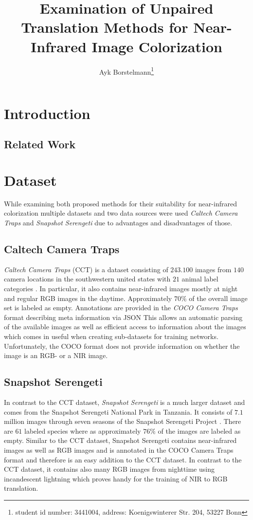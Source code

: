 \documentclass[a4paper,11pt, DIV=12]{scrartcl}
\title{Examination of Unpaired Translation Methods for Near-Infrared Image Colorization}
\author{Ayk Borstelmann\footnote{student id number: 3441004, address: Koenigswinterer Str. 204, 53227 Bonn}}
\begin{document}
\maketitle

\section{Introduction}

\subsection{Related Work}



\section{Dataset}
While examining both proposed methods for their suitability for near-infrared colorization multiple datasets 
and two data sources were used \textit{Caltech Camera Traps} and \textit{Snapshot Serengeti} due to advantages 
and disadvantages of those. 

\subsection{Caltech Camera Traps}
\textit{Caltech Camera Traps} (CCT) is a dataset consisting of $243.100$ images from $140$ camera locations 
in the southwestern united states with $21$ animal label categories \cite{caltech}. 
In particular, it also contains near-infrared images mostly at night and regular RGB images in the daytime. 
Approximately $70 \%$ of the overall image set is labeled as empty. 
Annotations are provided in the \textit{COCO Camera Traps} format describing meta information via JSON \cite{caltech}
This allows an automatic parsing of the available images as well as efficient access to information about 
the images which comes in useful when creating sub-datasets for training networks.
Unfortunately, the COCO format does not provide information on whether the image is an RGB- or a NIR image. 

\subsection{Snapshot Serengeti}
In contrast to the CCT dataset, \textit{Snapshot Serengeti} is a much larger dataset and comes from the Snapshot Serengeti National Park in Tanzania.
It consists of $7.1$ million images through seven seasons of the Snapshot Serengeti Project \cite{serengeti}. 
There are $61$ labeled species where as approximately $76\%$ of the images are labeled as empty. 
Similar to the CCT dataset, Snapshot Serengeti contains near-infrared images as well as RGB images and 
is annotated in the COCO Camera Traps format \cite{serengeti} and therefore is an easy addition to the CCT dataset.
In contrast to the CCT dataset, it contains also many RGB images from nighttime using incandescent lightning which 
proves handy for the training of NIR to RGB translation. 
\end{document}
